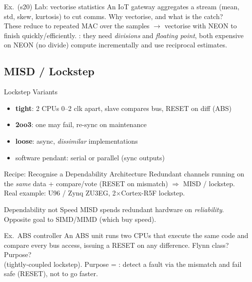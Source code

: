 \begin{example2}{Ex.\ (s20) Lab: vectorise statistics}
    An IoT gateway aggregates a stream (mean, std, skew, kurtosis) to cut comms. Why vectorise, and what is the catch?
     \\ 
    These reduce to repeated MAC over the samples $\to$ vectorise with NEON to finish quickly/efficiently. : they need \emph{divisions} and \emph{floating point}, both expensive on NEON (no divide) compute incrementally and use reciprocal estimates.
\end{example2}

\subsection{MISD / Lockstep}




\begin{definition}{Lockstep Variants}
    \begin{itemize}
        \item \textbf{tight}: 2 CPUs 0--2 clk apart, slave compares bus, RESET on diff (ABS)
        \item \textbf{2oo3}: one may fail, re-sync on maintenance
        \item \textbf{loose}: async, \emph{dissimilar} implementations
        \item software pendant: serial or parallel (sync outputs)
    \end{itemize}
\end{definition}

\begin{KR}{Recipe: Recognise a Dependability Architecture}
    Redundant channels running on the \emph{same} data + compare/vote (RESET on mismatch) $\Rightarrow$ MISD / lockstep. Real example: U96 / Zynq ZU3EG, 2$\times$Cortex-R5F lockstep.
\end{KR}

\begin{concept}{Dependability not Speed}
    MISD spends redundant hardware on \emph{reliability}. Opposite goal to SIMD/MIMD (which buy speed).
\end{concept}

\begin{example2}{Ex.\ ABS controller}
    An ABS unit runs two CPUs that execute the same code and compare every bus access, issuing a RESET on any difference. Flynn class? Purpose?
     \\ 
     (tightly-coupled lockstep). Purpose = : detect a fault via the mismatch and fail safe (RESET), not to go faster.
\end{example2}

